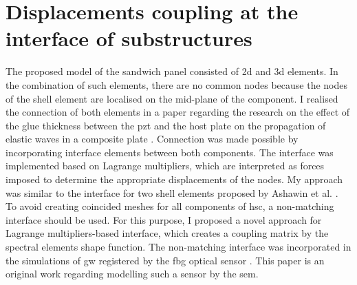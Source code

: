 \section{Displacements coupling at the interface of substructures}
\label{sec:interface}

The proposed model of the sandwich panel consisted of \ac{2d} and \ac{3d} elements.
In the combination of such elements, there are no common nodes because the nodes of the shell element are localised on the mid-plane of the component.
I realised the connection of both elements in a paper regarding the research on the effect of the glue thickness between the \ac{pzt} and the host plate on the propagation of elastic waves in a composite plate \cite{fiborek20192d}.
Connection was made possible by incorporating interface elements between both components.
The interface was implemented based on Lagrange multipliers, which are interpreted as forces imposed to determine the appropriate displacements of the nodes. My approach was similar to the interface for two shell elements proposed by Ashawin et al. \cite{ashwin2014formulation}.
To avoid creating coincided meshes for all components of \ac{hsc}, a non-matching interface should be used.
For this purpose, I proposed a novel approach for Lagrange multipliers-based interface, which creates a coupling matrix by the spectral elements shape function.
The non-matching interface was incorporated in the simulations of \ac{gw} registered by the \ac{fbg} optical sensor \cite{fiborek2022spectral}.
This paper is an original work regarding modelling such a sensor by the \ac{sem}.

